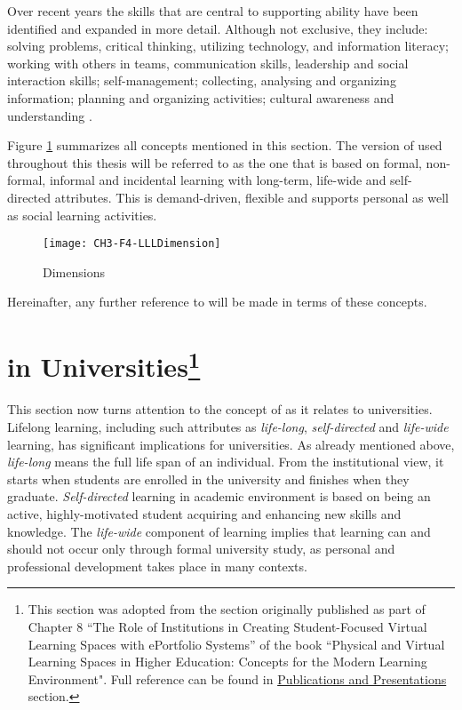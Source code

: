 Over recent years the skills that are central to supporting \LLLs ability have
been identified and expanded in more detail. Although not exclusive, they
include: solving problems, critical thinking, utilizing technology, and
information literacy; working with others in teams, communication skills,
leadership and social interaction skills; self-management; collecting, analysing
and organizing information; planning and organizing activities; cultural
awareness and understanding \citep{Brooks2008,Heinrich2007,Otala1997,Pitman2009}. 

Figure \ref{fig:llldim} summarizes all concepts mentioned in this section.
The version of \LLLs used throughout this thesis will be referred to as the one
that is based on formal, non-formal, informal and incidental learning with
long-term, life-wide and self-directed attributes. This \LLLs is demand-driven,
flexible and supports personal as well as social learning activities.

\begin{figure}[htb]
\centering
\texttt{[image: CH3-F4-LLLDimension]}
\caption{\LLLc Dimensions}
\label{fig:llldim}
\end{figure}

\FloatBarrier

Hereinafter, any further reference to \LLLs will be made in terms of these
concepts.

\section[\LLLc in Universities]{\LLLc in Universities\footnote{This section was
adopted from the section originally published as part of Chapter 8 ``The Role of
Institutions in Creating Student-Focused Virtual Learning Spaces with ePortfolio
Systems'' of the book ``Physical and Virtual Learning Spaces in Higher
Education: Concepts for the Modern Learning Environment". Full reference can be
found in \hyperref[sec:pub]{Publications and Presentations} section.} }

\label{sec:uni}

This section now turns attention to the concept of \LLLs as it relates to
universities. Lifelong learning, including such attributes as
\textit{life-long}, \textit{self-directed} and \textit{life-wide} learning, has
significant implications for universities. As already mentioned above,
\textit{life-long} means the full life span of an individual. From the
institutional view, it starts when students are enrolled in the university and
finishes when they graduate. \textit{Self-directed} learning in academic
environment is based on being an active, highly-motivated student acquiring and
enhancing new skills and knowledge. The \textit{life-wide} component of learning
implies that learning can and should not occur only through formal university
study, as personal and professional development takes place in many contexts. 

